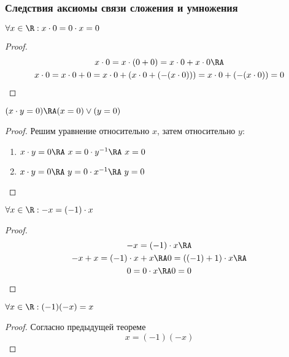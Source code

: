 \documentclass[a4paper, 14pt]{article}
\begin{document}
    \subsubsection*{Следствия аксиомы связи сложения и умножения}

    \begin{theorem}
        $\forall x \in \R: x \cdot 0 = 0 \cdot x = 0$
    \end{theorem}
    \begin{proof}
        \begin{multline*}
            x \cdot 0 = x \cdot (0 + 0) = x \cdot 0 + x \cdot 0 \RA \\
            x \cdot 0 = x \cdot 0 + 0 = x \cdot 0 + (x \cdot 0 + (-(x \cdot 0))) = x \cdot 0 + (-(x \cdot 0)) = 0
        \end{multline*}
    \end{proof}

    \begin{theorem}
        $(x \cdot y = 0) \RA (x = 0) \lor (y = 0)$
    \end{theorem}
    \begin{proof}
        Решим уравнение относительно $x$, затем относительно $y$:
        \begin{enumerate}
            \item $x \cdot y = 0 \RA \ x = 0 \cdot y^{-1} \RA \ x = 0$
            \item $x \cdot y = 0 \RA \ y = 0 \cdot x^{-1} \RA \ y = 0$
        \end{enumerate}
    \end{proof}

    \begin{theorem}
        $\forall x \in \R: -x = (-1) \cdot x$
    \end{theorem}
    \begin{proof}
        \begin{multline*}
            -x = (-1) \cdot x \RA \\ -x + x = (-1) \cdot x + x \RA  0 = ((-1) + 1) \cdot x \RA \\ 0 = 0 \cdot x \RA 0 = 0
        \end{multline*}
    \end{proof}

    \begin{theorem}
        $\forall x \in \R: (-1)(-x) = x$
    \end{theorem}
    \begin{proof}
        Согласно предыдущей теореме \[x = (-1)(-x) \]
    \end{proof}
\end{document}
